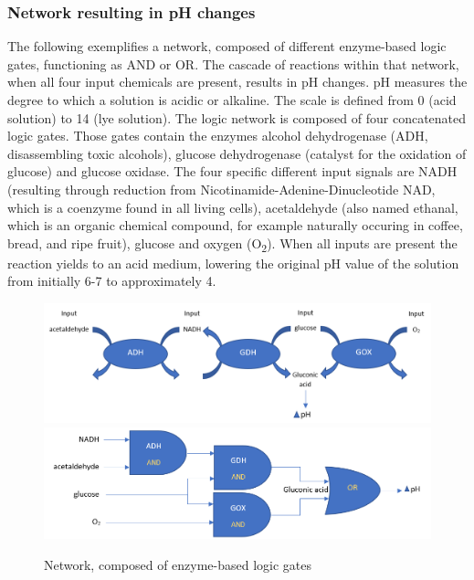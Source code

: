 \documentclass[runningheads]{llncs}
\begin{document}
		\subsubsection{Network resulting in pH changes} The following exemplifies a network, composed of different enzyme-based logic gates, functioning as AND or OR. The cascade of reactions within that network, when all four input chemicals are present, results in pH changes. pH measures the degree to which a solution is acidic or alkaline. The scale is defined from 0 (acid solution) to 14 (lye solution)\cite{chemie2}. The logic network is composed of four concatenated logic gates. Those gates contain the enzymes alcohol dehydrogenase (ADH, disassembling toxic alcohols), glucose dehydrogenase (catalyst for the oxidation of glucose) and glucose oxidase\cite{chemie2}. The four specific different input signals are NADH (resulting through reduction from Nicotinamide-Adenine-Dinucleotide NAD, which is a coenzyme found in all living cells),  acetaldehyde (also named ethanal, which is an organic chemical compound, for example naturally occuring in coffee, bread, and ripe fruit), glucose and oxygen (O\textsubscript{2})\cite{chemie2}.
	 	When all inputs are present the reaction yields to an acid medium, lowering the original pH value of the solution from initially 6-7 to approximately 4. \cite{original}\cite{chemie}


		
		\begin{figure}
			\centering \includegraphics[scale= 0.35]{pics/network1.png}
			\includegraphics[scale = 0.39]{pics/network2.png} \caption{Network, composed of enzyme-based logic gates} 
		\end{figure}		
		
\end{document}
